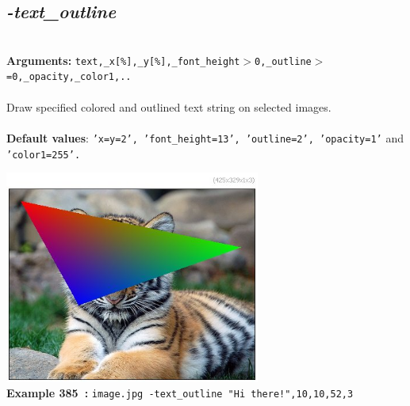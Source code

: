 \documentclass[a4paper,11pt,twoside]{book}
\begin{document}
\subsection{\emph{-text\_outline} }\vspace*{-0.5em}
~\\\textbf{Arguments: } 
{\small \texttt{text,\_x[\%],\_y[\%],\_font\_height$>$0,\_outline$>$=0,\_opacity,\_color1,..}}\\~\\
Draw specified colored and outlined text string on selected images.
~\\~\\\textbf{Default values}: {\small \texttt{'x=y=2', 'font\_height=13', 'outline=2', 'opacity=1'} and \texttt{'color1=255'.}}
\begin{center}\includegraphics[keepaspectratio=true,height=7cm,width=\textwidth]{img/gmic_def385.jpg}\\
{\footnotesize \textbf{Example 385~:} \texttt{image.jpg -text\_outline "Hi there!",10,10,52,3}}
\end{center}
\end{document}
